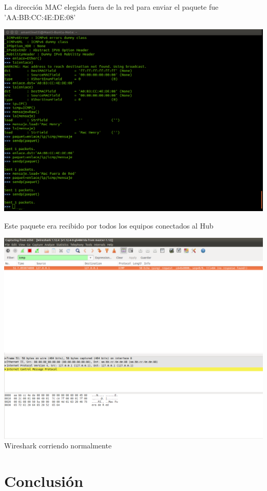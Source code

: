 \documentclass[spanish]{udpreport}
\begin{document}
La dirección MAC elegida fuera de la red para enviar el paquete fue 'AA:BB:CC:4E:DE:08'

\begin{center}
	\includegraphics[scale=.27]{imagenes/Hub/consoleout.png}
\end{center}

Este paquete era recibido por todos los equipos conectados al Hub

\begin{center}
	\includegraphics[scale=.27]{imagenes/Hub/wireout.png}
	\\ Wireshark corriendo normalmente 
\end{center}

\chapter{Conclusión}

\end{document}
